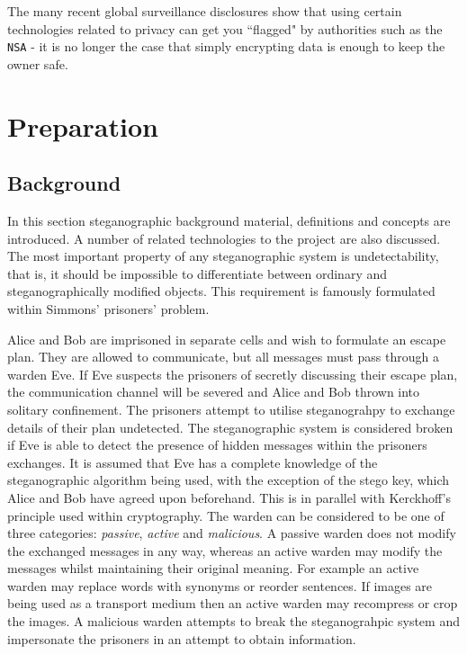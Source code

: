 \documentclass[paper=a4, fontsize=11pt,twoside]{scrartcl}    %
\numberwithin{table}{section}
\numberwithin{figure}{section}
\numberwithin{algorithm}{section}
\begin{document}
The many recent global surveillance disclosures show that using certain technologies related to privacy can get you ``flagged" by authorities such as the \texttt{NSA} - it is no longer the case that simply encrypting data is enough to keep the owner safe.

\section{Preparation}
\subsection{Background}
In this section steganographic background material, definitions and concepts are introduced. A number of related technologies to the project are also discussed.\\

\noindent
The most important property of any steganographic system is undetectability, that is, it should be impossible to differentiate between ordinary and steganographically modified objects. This requirement is famously formulated within Simmons' prisoners' problem. 

Alice and Bob are imprisoned in separate cells and wish to formulate an escape plan. They are allowed to communicate, but all messages must pass through a warden Eve. If Eve suspects the prisoners of secretly discussing their escape plan, the communication channel will be severed and Alice and Bob thrown into solitary confinement. The prisoners attempt to utilise steganograhpy to exchange details of their plan undetected. The steganographic system is considered broken if Eve is able to detect the presence of hidden messages within the prisoners exchanges. It is assumed that Eve has a complete knowledge of the steganographic algorithm being used, with the exception of the stego key, which Alice and Bob have agreed upon beforehand. This is in parallel with Kerckhoff's principle used within cryptography. The warden can be considered to be one of three categories: \textit{passive}, \textit{active} and \textit{malicious}. A passive warden does not modify the exchanged messages in any way, whereas an active warden may modify the messages whilst maintaining their original meaning. For example an active warden may replace words with synonyms or reorder sentences. If images are being used as a transport medium then an active warden may recompress or crop the images. A malicious warden attempts to break the steganograhpic system and impersonate the prisoners in an attempt to obtain information.
\end{document}
